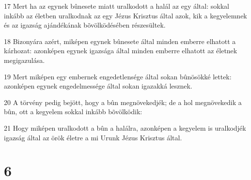 \par 17 Mert ha az egynek bûnesete miatt uralkodott a halál az egy által: sokkal inkább az életben uralkodnak az egy Jézus Krisztus által azok, kik a kegyelemnek és az igazság ajándékának bõvölködésében részesültek.
\par 18 Bizonyára azért, miképen egynek bûnesete által minden emberre elhatott a kárhozat: azonképen egynek igazsága által minden emberre elhatott az életnek megigazulása.
\par 19 Mert miképen egy embernek engedetlensége által sokan bûnösökké lettek: azonképen egynek engedelmessége által sokan igazakká lesznek.
\par 20 A törvény pedig bejött, hogy a bûn megnövekedjék; de a hol megnövekedik a bûn, ott a kegyelem sokkal inkább bõvölködik:
\par 21 Hogy miképen uralkodott a bûn a halálra, azonképen a kegyelem is uralkodjék igazság által az örök életre a mi Urunk Jézus Krisztus által.

\chapter{6}

